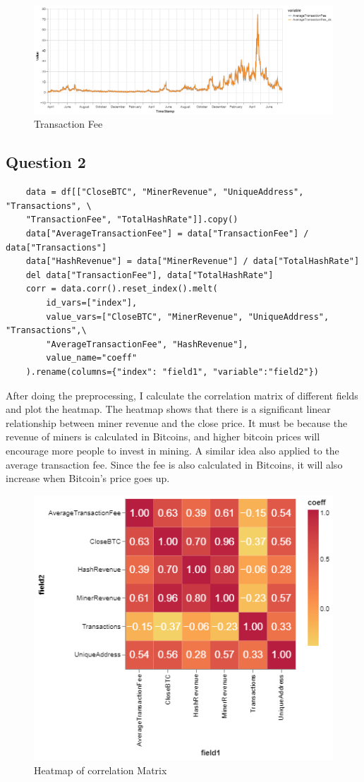 \documentclass[a4paper]{article}
\begin{document}
\begin{figure}[H]
    \centering
    \includegraphics[scale=0.5]{AverageTransactionFee.png}
    \caption{Transaction Fee}
\end{figure}
\subsection{Question 2}
\begin{verbatim}
    data = df[["CloseBTC", "MinerRevenue", "UniqueAddress", "Transactions", \
    "TransactionFee", "TotalHashRate"]].copy()
    data["AverageTransactionFee"] = data["TransactionFee"] / data["Transactions"]
    data["HashRevenue"] = data["MinerRevenue"] / data["TotalHashRate"]
    del data["TransactionFee"], data["TotalHashRate"]
    corr = data.corr().reset_index().melt(
        id_vars=["index"], 
        value_vars=["CloseBTC", "MinerRevenue", "UniqueAddress", "Transactions",\
        "AverageTransactionFee", "HashRevenue"],
        value_name="coeff"
    ).rename(columns={"index": "field1", "variable":"field2"})
\end{verbatim}
\par After doing the preprocessing, I calculate the correlation matrix of different fields and plot the heatmap. The heatmap shows that there is a significant linear relationship between miner revenue and the close price. It must be because the revenue of miners is calculated in Bitcoins, and higher bitcoin prices will encourage more people to invest in mining. A similar idea also applied to the average transaction fee. Since the fee is also calculated in Bitcoins, it will also increase when Bitcoin's price goes up.
\begin{figure}[H]
    \centering
    \includegraphics[scale=0.5]{Heatmap.png}
    \caption{Heatmap of correlation Matrix}
\end{figure}
\end{document}
